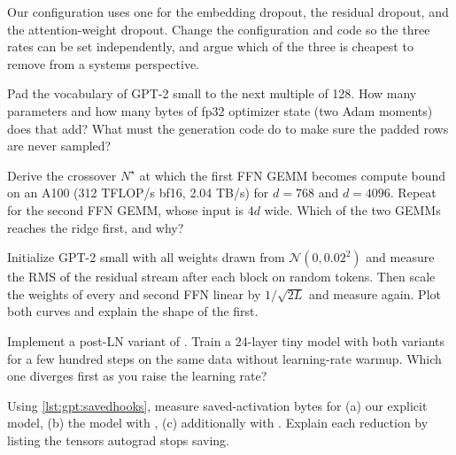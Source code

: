 \begin{exercise}
Our configuration uses one  for the embedding dropout, the residual dropout, and
the attention-weight dropout. Change the configuration and code so the three rates can be set
independently, and argue which of the three is cheapest to remove from a systems perspective.
\end{exercise}

\begin{exercise}
Pad the vocabulary of GPT-2 small to the next multiple of 128. How many parameters and how many
bytes of fp32 optimizer state (two Adam moments) does that add? What must the generation code do
to make sure the padded rows are never sampled?
\end{exercise}

\begin{exercise}
Derive the crossover $N^\star$ at which the first FFN GEMM becomes compute bound on an A100
(312 TFLOP/s bf16, 2.04 TB/s) for $d=768$ and $d=4096$. Repeat for the second FFN GEMM, whose
input is $4d$ wide. Which of the two GEMMs reaches the ridge first, and why?
\end{exercise}

\begin{exercise}
Initialize GPT-2 small with all weights drawn from $\mathcal N(0,0.02^2)$ and measure the RMS of the
residual stream after each block on random tokens. Then scale the weights of every
 and second FFN linear by $1/\sqrt{2L}$ and measure again. Plot both curves and explain
the shape of the first.
\end{exercise}

\begin{exercise}[Post-LN]
Implement a post-LN variant of . Train a 24-layer tiny model with both
variants for a few hundred steps on the same data without learning-rate warmup. Which one diverges
first as you raise the learning rate?
\end{exercise}

\begin{exercise}
Using \cref{lst:gpt:savedhooks}, measure saved-activation bytes for (a) our explicit model,
(b) the model with , (c) additionally with .
Explain each reduction by listing the tensors autograd stops saving.
\end{exercise}

